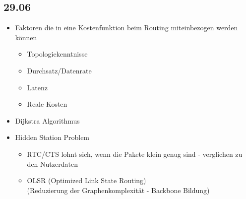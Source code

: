 \documentclass{article} %
\begin{document}
	\subsection{29.06}
	\begin{itemize}
		\item Faktoren die in eine Kostenfunktion beim Routing miteinbezogen werden können
		\begin{itemize}
			\item Topologiekenntnisse
			\item Durchsatz/Datenrate
			\item Latenz
			\item Reale Kosten
		\end{itemize}
		\item Dijkstra Algorithmus
		\item Hidden Station Problem
		\begin{itemize}
			\item RTC/CTS lohnt sich, wenn die Pakete klein genug sind - verglichen zu den Nutzerdaten
			\item OLSR (Optimized Link State Routing)\\
			(Reduzierung der Graphenkomplexität - Backbone Bildung)
		\end{itemize}
	\end{itemize}
\end{document}
